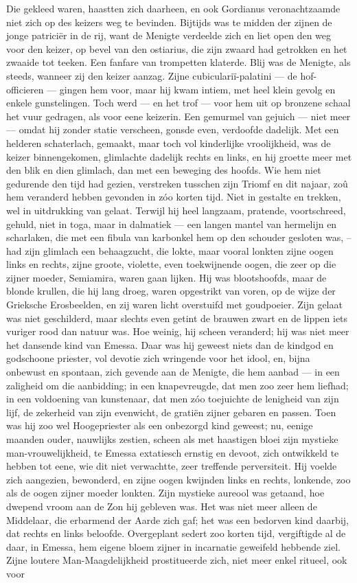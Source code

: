 \documentclass[a4paper, 12pt, oneside, dutch]{article}
\begin{document}
Die gekleed waren, haastten zich daarheen, en ook Gordianus veronachtzaamde niet zich op des keizers weg te bevinden. Bijtijds was te midden der zijnen de jonge patriciër in de rij, want de Menigte verdeelde zich en liet open den weg voor den keizer, op bevel van den ostiarius, die zijn zwaard had getrokken en het zwaaide tot teeken. Een fanfare van trompetten klaterde. Blij was de Menigte, als steeds, wanneer zij den keizer aanzag. Zijne cubiculariï-palatini --- de hof-officieren --- gingen hem voor, maar hij kwam intiem, met heel klein gevolg en enkele gunstelingen. Toch werd --- en het trof --- voor hem uit op bronzene schaal het vuur gedragen, als voor eene keizerin. Een gemurmel van gejuich --- niet meer --- omdat hij zonder statie verscheen, gonsde even, verdoofde dadelijk. Met een helderen schaterlach, gemaakt, maar toch vol kinderlijke vroolijkheid, was de keizer binnengekomen, glimlachte dadelijk rechts en links, en hij groette meer met den blik en dien glimlach, dan met een beweging des hoofds. Wie hem niet gedurende den tijd had gezien, verstreken tusschen zijn Triomf en dit najaar, zoû hem veranderd hebben gevonden in zóo korten tijd. Niet in gestalte en trekken, wel in uitdrukking van gelaat. Terwijl hij heel langzaam, pratende, voortschreed, gehuld, niet in toga, maar in dalmatiek --- een langen mantel van hermelijn en scharlaken, die met een fibula van karbonkel hem op den schouder gesloten was, -- had zijn glimlach een behaagzucht, die lokte, maar vooral lonkten zijne oogen links en rechts, zijne groote, violette, even toekwijnende oogen, die zeer op die zijner moeder, Semiamira, waren gaan lijken. Hij was blootshoofds, maar de blonde krullen, die hij lang droeg, waren opgestrikt van voren, op de wijze der Grieksche Erosbeelden, en zij waren licht overstuifd met goudpoeier. Zijn gelaat was niet geschilderd, maar slechts even getint de brauwen zwart en de lippen iets vuriger rood dan natuur was. Hoe weinig, hij scheen veranderd; hij was niet meer het dansende kind van Emessa. Daar was hij geweest niets dan de kindgod en godschoone priester, vol devotie zich wringende voor het idool, en, bijna onbewust en spontaan, zich gevende aan de Menigte, die hem aanbad --- in een zaligheid om die aanbidding; in een knapevreugde, dat men zoo zeer hem liefhad; in een voldoening van kunstenaar, dat men zóo toejuichte de lenigheid van zijn lijf, de zekerheid van zijn evenwicht, de gratiën zijner gebaren en passen. Toen was hij zoo wel Hoogepriester als een onbezorgd kind geweest; nu, eenige maanden ouder, nauwlijks zestien, scheen als met haastigen bloei zijn mystieke man-vrouwelijkheid, te Emessa extatiesch ernstig en devoot, zich ontwikkeld te hebben tot eene, wie dit niet verwachtte, zeer treffende perversiteit. Hij voelde zich aangezien, bewonderd, en zijne oogen kwijnden links en rechts, lonkende, zoo als de oogen zijner moeder lonkten. Zijn mystieke aureool was getaand, hoe dwepend vroom aan de Zon hij gebleven was. Het was niet meer alleen de Middelaar, die erbarmend der Aarde zich gaf; het was een bedorven kind daarbij, dat rechts en links beloofde. Overgeplant sedert zoo korten tijd, vergiftigde al de daar, in Emessa, hem eigene bloem zijner in incarnatie geweifeld hebbende ziel. Zijne loutere Man-Maagdelijkheid prostitueerde zich, niet meer enkel ritueel, ook voor 
\end{document}
